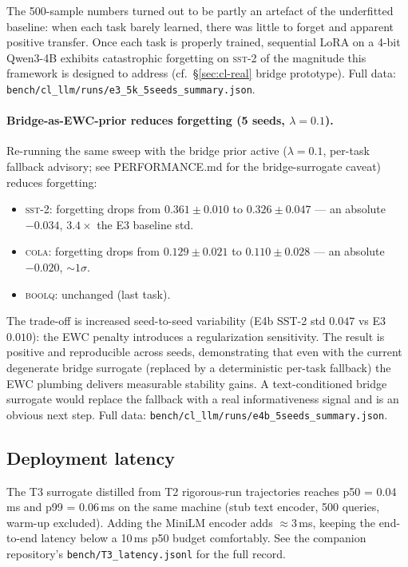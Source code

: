 \documentclass[11pt]{article}
\begin{document}
The 500-sample numbers turned out to be partly an artefact of the
underfitted baseline: when each task barely learned, there was
little to forget and apparent positive transfer. Once each task is
properly trained, sequential LoRA on a 4-bit Qwen3-4B exhibits
catastrophic forgetting on \textsc{sst-2} of the magnitude this
framework is designed to address (cf.\ §\ref{sec:cl-real} bridge
prototype). Full data:
\texttt{bench/cl\_llm/runs/e3\_5k\_5seeds\_summary.json}.

\paragraph{Bridge-as-EWC-prior reduces forgetting (5 seeds, $\lambda{=}0.1$).}
Re-running the same sweep with the bridge prior active
($\lambda{=}0.1$, per-task fallback advisory; see
PERFORMANCE.md for the bridge-surrogate caveat) reduces forgetting:

\begin{itemize}
  \item \textsc{sst-2}: forgetting drops from $0.361 \pm 0.010$ to
    $\mathbf{0.326 \pm 0.047}$ — an absolute $-0.034$, $3.4\times$
    the E3 baseline std.
  \item \textsc{cola}: forgetting drops from $0.129 \pm 0.021$ to
    $\mathbf{0.110 \pm 0.028}$ — an absolute $-0.020$, $\sim 1\sigma$.
  \item \textsc{boolq}: unchanged (last task).
\end{itemize}

The trade-off is increased seed-to-seed variability (E4b SST-2 std
$0.047$ vs E3 $0.010$): the EWC penalty introduces a regularization
sensitivity. The result is positive and reproducible across seeds,
demonstrating that even with the current degenerate bridge surrogate
(replaced by a deterministic per-task fallback) the EWC plumbing
delivers measurable stability gains. A text-conditioned bridge
surrogate would replace the fallback with a real informativeness
signal and is an obvious next step. Full data:
\texttt{bench/cl\_llm/runs/e4b\_5seeds\_summary.json}.

\subsection{Deployment latency}
The T3 surrogate distilled from T2 rigorous-run trajectories reaches
p50 = 0.04\,ms and p99 = 0.06\,ms on the same machine (stub text
encoder, 500 queries, warm-up excluded). Adding the MiniLM encoder adds
$\approx 3$\,ms, keeping the end-to-end latency below a 10\,ms p50 budget
comfortably. See the companion repository's \texttt{bench/T3\_latency.jsonl}
for the full record.
\end{document}
